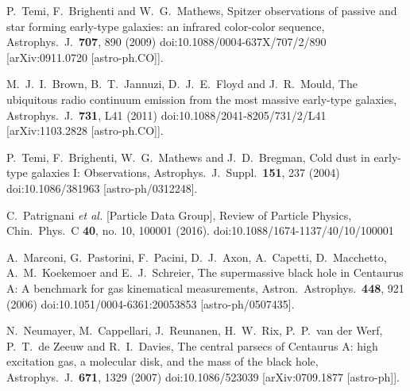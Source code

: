 \documentclass[aps,prd,twocolumn,superscriptaddress,tightenlines,nofootinbib]{revtex4-1}
\begin{document}
\begin{thebibliography}{99}
  P.~Temi, F.~Brighenti and W.~G.~Mathews,
  {\color{rossoCP3}  Spitzer observations of passive and star forming early-type galaxies: an infrared color-color sequence},
  Astrophys.\ J.\  {\bf 707}, 890 (2009)
  doi:10.1088/0004-637X/707/2/890
  [arXiv:0911.0720 [astro-ph.CO]].

  M.~J.~I.~Brown, B.~T.~Jannuzi, D.~J.~E.~Floyd and J.~R.~Mould,
   {\color{rossoCP3} The ubiquitous radio continuum emission from the most massive early-type galaxies},
  Astrophys.\ J.\  {\bf 731}, L41 (2011)
  doi:10.1088/2041-8205/731/2/L41
  [arXiv:1103.2828 [astro-ph.CO]].



  P.~Temi, F.~Brighenti, W.~G.~Mathews and J.~D.~Bregman,
  {\color{rossoCP3} Cold dust in early-type galaxies I: Observations},
  Astrophys.\ J.\ Suppl.\  {\bf 151}, 237 (2004)
  doi:10.1086/381963
  [astro-ph/0312248].



  C.~Patrignani {\it et al.} [Particle Data Group],
   {\color{rossoCP3}  Review of Particle Physics},
  Chin.\ Phys.\ C {\bf 40}, no. 10, 100001 (2016).
  doi:10.1088/1674-1137/40/10/100001



  A.~Marconi, G.~Pastorini, F.~Pacini, D.~J.~Axon, A.~Capetti, D.~Macchetto, A.~M.~Koekemoer and E.~J.~Schreier,
   {\color{rossoCP3}  The supermassive black hole in Centaurus A: A benchmark for gas kinematical measurements},
  Astron.\ Astrophys.\  {\bf 448}, 921 (2006)
  doi:10.1051/0004-6361:20053853
  [astro-ph/0507435].




  N.~Neumayer, M.~Cappellari, J.~Reunanen, H.~W.~Rix, P.~P.~van der Werf, P.~T.~de Zeeuw and R.~I.~Davies,
   {\color{rossoCP3}  The central parsecs of Centaurus A: high excitation gas, a molecular disk, and the mass of the black hole},
  Astrophys.\ J.\  {\bf 671}, 1329 (2007)
  doi:10.1086/523039
  [arXiv:0709.1877 [astro-ph]].




\end{thebibliography}
\end{document}
